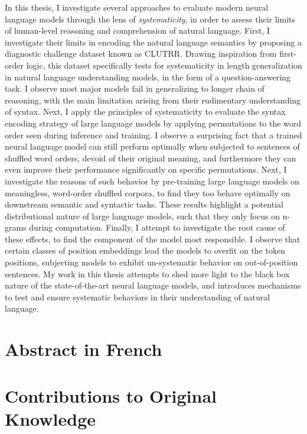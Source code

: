 \documentclass[letterpaper, 12pt]{report}
\begin{document}
In this thesis, I investigate several approaches to evaluate modern neural language models through the lens of \textit{systematicity}, in order to assess their limits of human-level reasoning and comprehension of natural language. First, I investigate their limits in encoding the natural language semantics by proposing a diagnostic challenge dataset known as CLUTRR. Drawing inspiration from first-order logic, this dataset specifically tests for systematicity in length generalization in natural language understanding models, in the form of a question-answering task. I observe most major models fail in generalizing to longer chain of reasoning, with the main limitation arising from their rudimentary understanding of syntax. Next, I apply the principles of systematicity to evaluate the syntax encoding strategy of large language models by applying permutations to the word order seen during inference and training. I observe a surprising fact that a trained neural language model can still perform optimally when subjected to sentences of shuffled word orders, devoid of their original meaning, and furthermore they can even improve their performance significantly on specific permutations. Next, I investigate the reasons of such behavior by pre-training large language models on meaningless, word-order shuffled corpora, to find they too behave optimally on downstream semantic and syntactic tasks. These results highlight a potential distributional nature of large language models, such that they only focus on n-grams during computation. Finally, I attempt to investigate the root cause of these effects, to find the component of the model most responsible. I observe that certain classes of position embeddings lead the models to overfit on the token positions, subjecting models to exhibit un-systematic behavior on out-of-position sentences. My work in this thesis attempts to shed more light to the black box nature of the state-of-the-art neural language models, and introduces mechanisms to test and ensure systematic behaviors in their understanding of natural language.

\chapter*{Abstract in French}
\label{sec:org71795cd}
\chapter*{Contributions to Original Knowledge}
\label{sec:orig_cont}
\end{document}

